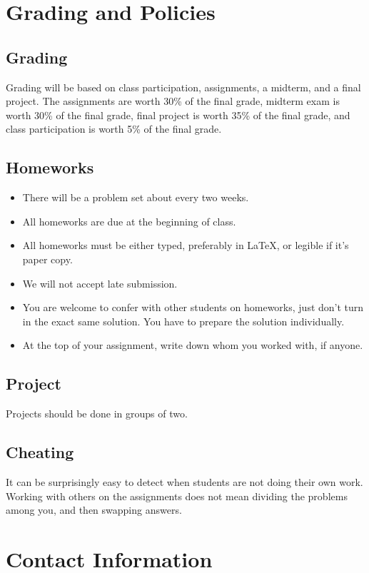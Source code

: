 \documentclass{article}
\begin{document}
\section{Grading and Policies}
\subsection{Grading}
Grading will be based on class participation, assignments, a midterm,
and a final project. The assignments are worth 30\% of the final
grade, midterm exam is worth 30\% of the final grade, final project is
worth 35\% of the final grade, and class participation is worth 5\% of
the final grade.

\subsection{Homeworks}
\begin{itemize}
\item There will be a problem set about every two weeks.
\item All homeworks are due at the beginning of class.
\item All homeworks must be either typed, preferably in LaTeX, or
  legible if it's paper copy.
\item We will not accept late submission.
\item You are welcome to confer with other students on homeworks, just
  don't turn in the exact same solution. You have to prepare the
  solution individually.
\item At the top of your assignment, write down whom you worked with,
  if anyone.
\end{itemize}

\subsection{Project}
Projects should be done in groups of two.

\subsection{Cheating}
It can be surprisingly easy to detect when students are not doing
their own work. Working with others on the assignments does not mean
dividing the problems among you, and then swapping answers.

\section{Contact Information}
\end{document}
